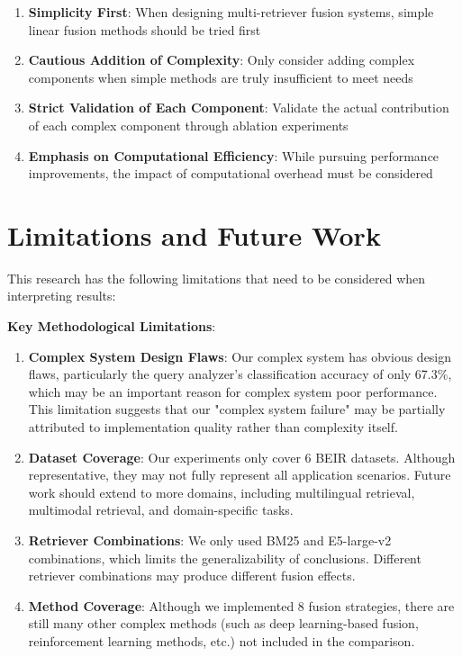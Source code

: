 \documentclass[letterpaper]{article} %
\begin{document}
\begin{enumerate}
\item \textbf{Simplicity First}: When designing multi-retriever fusion systems, simple linear fusion methods should be tried first
\item \textbf{Cautious Addition of Complexity}: Only consider adding complex components when simple methods are truly insufficient to meet needs
\item \textbf{Strict Validation of Each Component}: Validate the actual contribution of each complex component through ablation experiments
\item \textbf{Emphasis on Computational Efficiency}: While pursuing performance improvements, the impact of computational overhead must be considered
\end{enumerate}

\section{Limitations and Future Work}

This research has the following limitations that need to be considered when interpreting results:

\textbf{Key Methodological Limitations}:

\begin{enumerate}
\item \textbf{Complex System Design Flaws}: Our complex system has obvious design flaws, particularly the query analyzer's classification accuracy of only 67.3\%, which may be an important reason for complex system poor performance. This limitation suggests that our "complex system failure" may be partially attributed to implementation quality rather than complexity itself.

\item \textbf{Dataset Coverage}: Our experiments only cover 6 BEIR datasets. Although representative, they may not fully represent all application scenarios. Future work should extend to more domains, including multilingual retrieval, multimodal retrieval, and domain-specific tasks.

\item \textbf{Retriever Combinations}: We only used BM25 and E5-large-v2 combinations, which limits the generalizability of conclusions. Different retriever combinations may produce different fusion effects.

\item \textbf{Method Coverage}: Although we implemented 8 fusion strategies, there are still many other complex methods (such as deep learning-based fusion, reinforcement learning methods, etc.) not included in the comparison.
\end{enumerate}
\end{document}
